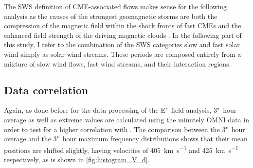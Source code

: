 The SWS definition of CME-associated flows makes sense for the following analysis as the causes of the strongest geomagnetic storms are both the compression of the magnetic field within the shock fronts of fast CMEs and the enhanced field strength of the driving magnetic clouds \citep{Bothmer1995}. In the following part of this study, I refer to the combination of the SWS categories slow and fast solar wind simply as solar wind streams. These periods are composed entirely from a mixture of slow wind flows, fast wind streams, and their interaction regions.


\subsection{Data correlation}
Again, as done before for the data processing of the E"~field analysis, 3"~hour average as well as extreme values are calculated using the minutely OMNI data in order to test for a higher correlation with \Kp{}. The comparison between the 3"~hour average and the 3"~hour maximum frequency distributions shows that their mean positions are shifted slightly, having velocities of \SI{405}{\km\per\s} and \SI{425}{\km\per\s} respectively, as is shown in \autoref{fig:histogram_V_d}.
